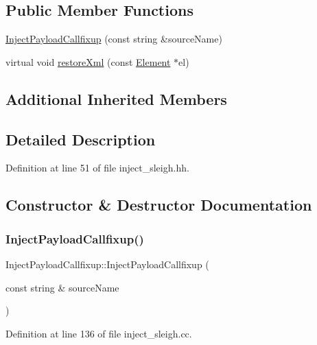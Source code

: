 \subsection*{Public Member Functions}
\begin{DoxyCompactItemize}
\item 
\mbox{\hyperlink{class_inject_payload_callfixup_a184529070510bf763898b06074253259}{Inject\+Payload\+Callfixup}} (const string \&source\+Name)
\item 
virtual void \mbox{\hyperlink{class_inject_payload_callfixup_a79e5f333168b25b8cd91e18e809029eb}{restore\+Xml}} (const \mbox{\hyperlink{class_element}{Element}} $\ast$el)
\end{DoxyCompactItemize}
\subsection*{Additional Inherited Members}


\subsection{Detailed Description}


Definition at line 51 of file inject\+\_\+sleigh.\+hh.



\subsection{Constructor \& Destructor Documentation}
\mbox{\label{class_inject_payload_callfixup_a184529070510bf763898b06074253259}} 
\subsubsection{\texorpdfstring{InjectPayloadCallfixup()}{InjectPayloadCallfixup()}}
{\footnotesize\ttfamily Inject\+Payload\+Callfixup\+::\+Inject\+Payload\+Callfixup (\begin{DoxyParamCaption}\item[{const string \&}]{source\+Name }\end{DoxyParamCaption})}



Definition at line 136 of file inject\+\_\+sleigh.\+cc.



